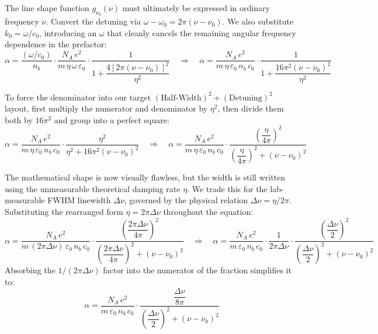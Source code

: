 The line shape function $g_{\nu_0}(\nu)$ must ultimately be expressed in ordinary frequency $\nu$. Convert the detuning via $\omega - \omega_0 = 2\pi(\nu - \nu_0)$. We also substitute $k_0 = \omega/c_0$, introducing an $\omega$ that cleanly cancels the remaining angular frequency dependence in the prefactor:
\begin{equation*}
    \alpha = \frac{(\omega/c_0)}{n_b}\cdot\frac{N_A\,e^2}{m\,\eta\,\omega\,\varepsilon_0}\cdot\frac{1}{1 + \dfrac{4\left[2\pi(\nu - \nu_0)\right]^2}{\eta^2}} \quad \Rightarrow \quad \alpha = \frac{N_A\,e^2}{m\,\eta\,\varepsilon_0\,n_b\,c_0}\cdot\frac{1}{1 + \dfrac{16\pi^2(\nu - \nu_0)^2}{\eta^2}}
\end{equation*}

To force the denominator into our target $(\text{Half-Width})^2 + (\text{Detuning})^2$ layout, first multiply the numerator and denominator by $\eta^2$, then divide them both by $16\pi^2$ and group into a perfect square:
\begin{equation*}
    \alpha = \frac{N_A\,e^2}{m\,\eta\,\varepsilon_0\,n_b\,c_0}\cdot\frac{\eta^2}{\eta^2 + 16\pi^2(\nu - \nu_0)^2} \quad \Rightarrow \quad \alpha = \frac{N_A\,e^2}{m\,\eta\,\varepsilon_0\,n_b\,c_0}\cdot\frac{\left(\dfrac{\eta}{4\pi}\right)^2}{\left(\dfrac{\eta}{4\pi}\right)^2 + (\nu - \nu_0)^2}
\end{equation*}

The mathematical shape is now visually flawless, but the width is still written using the unmeasurable theoretical damping rate $\eta$. We trade this for the lab-measurable FWHM linewidth $\Delta\nu$, governed by the physical relation $\Delta\nu = \eta/2\pi$. Substituting the rearranged form $\eta = 2\pi\Delta\nu$ throughout the equation:
\begin{equation*}
    \alpha = \frac{N_A\,e^2}{m\,(2\pi\Delta\nu)\,\varepsilon_0\,n_b\,c_0}\cdot\frac{\left(\dfrac{2\pi\Delta\nu}{4\pi}\right)^2}{\left(\dfrac{2\pi\Delta\nu}{4\pi}\right)^2 + (\nu - \nu_0)^2} \quad \Rightarrow \quad \alpha = \frac{N_A\,e^2}{m\,\varepsilon_0\,n_b\,c_0}\cdot\frac{1}{2\pi\Delta\nu}\cdot\frac{\left(\dfrac{\Delta\nu}{2}\right)^2}{\left(\dfrac{\Delta\nu}{2}\right)^2 + (\nu - \nu_0)^2}
\end{equation*}
Absorbing the $1/(2\pi\Delta\nu)$ factor into the numerator of the fraction simplifies it to:
\begin{equation*}
    \alpha = \frac{N_A\,e^2}{m\,\varepsilon_0\,n_b\,c_0}\cdot\frac{\dfrac{\Delta\nu}{8\pi}}{\left(\dfrac{\Delta\nu}{2}\right)^2 + (\nu - \nu_0)^2}
\end{equation*}

